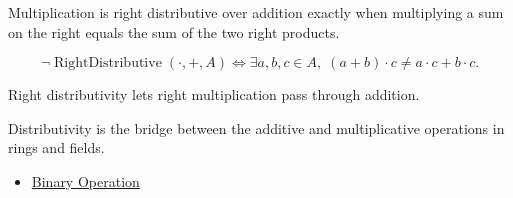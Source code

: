 \begin{remark*}
Multiplication is right distributive over addition exactly when multiplying a
sum on the right equals the sum of the two right products.
\end{remark*}

\begin{remark*}
\[
\neg\operatorname{RightDistributive}(\cdot,+,A)
\Longleftrightarrow
\exists a,b,c\in A,\; (a+b)\cdot c\neq a\cdot c+b\cdot c.
\]
\end{remark*}

\begin{remark*}[Interpretation]
Right distributivity lets right multiplication pass through addition.
\end{remark*}

\begin{remark*}
Distributivity is the bridge between the additive and multiplicative
operations in rings and fields.
\end{remark*}

\begin{dependencies}
\begin{itemize}
  \item \hyperref[def:binary-operation]{Binary Operation}
\end{itemize}
\end{dependencies}
